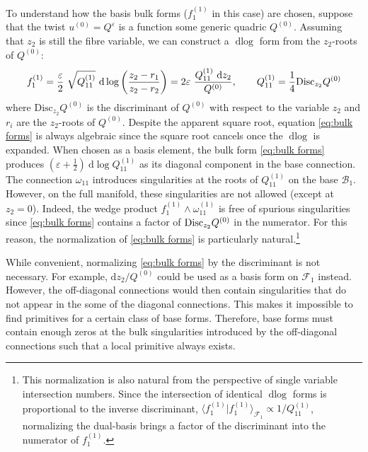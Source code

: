 \documentclass[11pt]{article}
\renewcommand{\d}{\text{d}}
\newcommand{\be}{\begin{equation}}
\newcommand{\ee}{\end{equation}}
\newcommand{\la}{\langle}
\newcommand{\ra}{\rangle}
\newcommand{\F}{\mathcal{F}}
\newcommand{\B}{\mathcal{B}}
\newcommand{\vep}{\varepsilon}
\newcommand{\disc}{{\rm Disc}}
\begin{document}
To understand how the basis bulk forms ($f^{(1)}_1$ in this case) are chosen, suppose that the twist  $u^{(0)}=Q^\vep$ is a function some generic quadric $Q^{(0)}$. Assuming that $z_2$ is still the fibre variable, we can construct a $\d\log$ form from the $z_2$-roots of $Q^{(0)}$:
\be \label{eq:bulk forms}
	f_1^{(1)} 
	= \frac{\vep}{2}\ \sqrt{Q^{(1)}_{11}}\ \d\log\left(\frac{z_2-r_1}{z_2-r_2}\right)
	= 2\vep\ \frac{Q^{(1)}_{11}\ \d z_2}{Q^{(0)}},
	\qquad 
	Q^{(1)}_{11} = \frac14 \disc_{z_2}Q^{(0)}
\ee
where $\text{Disc}_{z_2}Q^{(0)}$ is the discriminant of $Q^{(0)}$ with respect to the variable $z_2$ and $r_i$ are the $z_2$-roots of $Q^{(0)}$. Despite the apparent square root, equation \eqref{eq:bulk forms} is always algebraic since the square root cancels once the $\d\log$ is expanded. When chosen as a basis element, the bulk form \eqref{eq:bulk forms} produces $(\vep+\frac12)\ \d\log Q^{(1)}_{11}$ as its diagonal component in the base connection. The connection $\omega_{11}$ introduces singularities at the roots of $Q^{(1)}_{11}$ on the base $\B_1$. However, on the full manifold, these singularities are not allowed (except at $z_2=0$). 
Indeed, the wedge product $f^{(1)}_1 \wedge \omega^{(1)}_{11}$ is free of spurious singularities since \eqref{eq:bulk forms} contains a factor of $\disc_{z_2}Q^{(0)}$ in the numerator. For this reason, the normalization of \eqref{eq:bulk forms} is particularly natural.\footnote{This normalization is also natural from the perspective of single variable intersection numbers. Since the intersection of identical $\d\log$ forms is proportional to the inverse discriminant,  $\la f^{(1)}_1 \vert f^{(1)}_1 \ra_{\F_1} \propto 1/Q^{(1)}_{11}$, normalizing the dual-basis brings a factor of the discriminant into the numerator of $f^{(1)}_1$.}

While convenient, normalizing \eqref{eq:bulk forms} by the discriminant is not necessary. For example, $\d z_{2}/Q^{(0)}$ could be used as a basis form on $\F_1$ instead. However, the off-diagonal connections would then contain singularities that do not appear in the some of the diagonal connections. This makes it impossible to find primitives for a certain class of base forms. Therefore, base forms must contain enough zeros at the bulk singularities introduced by the off-diagonal connections such that a local primitive always exists.
 
\end{document}
